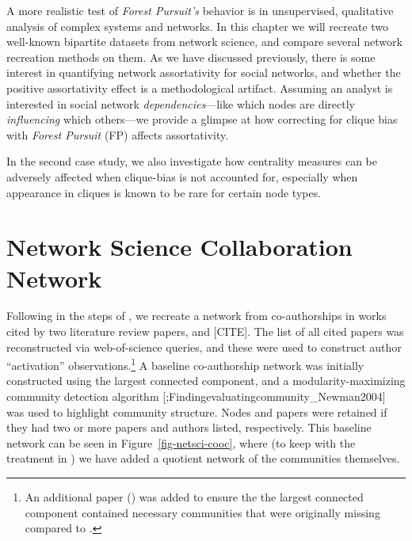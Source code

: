 \documentclass[%
	12pt,
		oneside,
		letterpaper
]{book}
\begin{document}
A more realistic test of \emph{Forest Pursuit's} behavior is in
unsupervised, qualitative analysis of complex systems and networks. In
this chapter we will recreate two well-known bipartite datasets from
network science, and compare several network recreation methods on them.
As we have discussed
previously\autocite{PerceivedAssortativitySocial_Fisher2017}, there is
some interest in quantifying network assortativity for social networks,
and whether the positive assortativity effect is a methodological
artifact. Assuming an analyst is interested in social network
\emph{dependencies}---like which nodes are directly \emph{influencing}
which others---we provide a glimpse at how correcting for clique bias
with \emph{Forest Pursuit} (FP) affects assortativity.

In the second case study, we also investigate how centrality measures
can be adversely affected when clique-bias is not accounted for,
especially when appearance in cliques is known to be rare for certain
node types.

\section{Network Science Collaboration
Network}\label{network-science-collaboration-network}

Following in the steps of
\textcite{Findingevaluatingcommunity_Newman2004}, we recreate a network
from co-authorships in works cited by two literature review papers,
\textcite{StructureFunctionComplex_Newman2003} and {[}CITE{]}. The list
of all cited papers was reconstructed via web-of-science queries, and
these were used to construct author ``activation''
observations.\footnote{ An additional paper
  (\textcite{Coherentnoisescale_Sneppen1997}) was added to ensure the
  the largest connected component contained necessary communities that
  were originally missing compared to
  \textcite{Findingevaluatingcommunity_Newman2004}.} A baseline
co-authorship network was initially constructed using the largest
connected component, and a modularity-maximizing community detection
algorithm
{[}\textcite{Findingcommunitystructure_Clauset2004};Findingevaluatingcommunity\_Newman2004{]}
was used to highlight community structure. Nodes and papers were
retained if they had two or more papers and authors listed,
respectively. This baseline network can be seen in
Figure~\ref{fig-netsci-cooc}, where (to keep with the treatment in
\textcite{Findingevaluatingcommunity_Newman2004}) we have added a
quotient network of the communities themselves.
\end{document}
